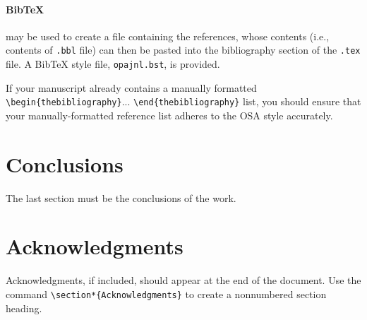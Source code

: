 \documentclass[10pt,letterpaper]{article}
\begin{document}
\paragraph{Bib\TeX} may be used to create a file containing the references, whose contents (i.e., contents of \texttt{.bbl} file) can then be pasted into the bibliography section of the \texttt{.tex} file. A Bib\TeX{} style file, \texttt{opajnl.bst}, is provided.

If your manuscript already contains a manually formatted \verb|\begin{thebibliography}|... \verb|\end{thebibliography}| list, you should ensure that your manually-formatted reference list adheres to the OSA style accurately.

\section{Conclusions}
The last section must be the conclusions of the work.


\section*{Acknowledgments} 
Acknowledgments, if included, should appear at the end of the document. 
Use the command \verb+\section*{Acknowledgments}+  to create a nonnumbered section heading.
\end{document}
